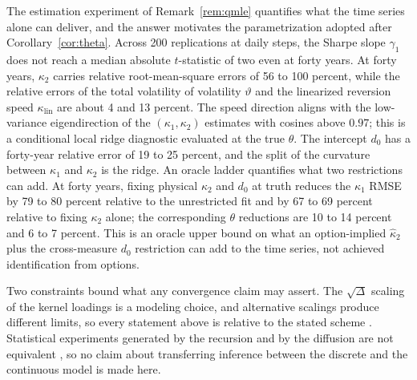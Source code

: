 \documentclass[11pt]{article}
\theoremstyle{remark}
\newcommand{\Dt}{\Delta}
\begin{document}
The estimation experiment of Remark~\ref{rem:qmle} quantifies what the
time series alone can deliver, and the answer motivates the
parametrization adopted after Corollary~\ref{cor:theta}.
Across 200 replications at daily steps, the Sharpe slope $\gamma_1$ does
not reach a median absolute $t$-statistic of two even at forty years.
At forty years, $\kappa_2$ carries relative root-mean-square errors of 56
to 100 percent, while the relative errors of the total volatility of
volatility $\vartheta$ and the linearized reversion speed
$\kappa_{\mathrm{lin}}$ are about 4 and 13 percent.
The speed direction aligns with the low-variance eigendirection of the
$(\kappa_1,\kappa_2)$ estimates with cosines above $0.97$; this is a
conditional local ridge diagnostic evaluated at the true $\theta$.
The intercept $d_0$ has a forty-year relative error of 19 to 25 percent,
and the split of the curvature between $\kappa_1$ and $\kappa_2$ is the
ridge.
An oracle ladder quantifies what two restrictions can add.
At forty years, fixing physical $\kappa_2$ and $d_0$ at truth reduces the
$\kappa_1$ RMSE by 79 to 80 percent relative to the unrestricted fit and
by 67 to 69 percent relative to fixing $\kappa_2$ alone; the corresponding
$\theta$ reductions are 10 to 14 percent and 6 to 7 percent.
This is an oracle upper bound on what an option-implied
$\hat\kappa_2$ plus the cross-measure $d_0$ restriction can add to the time
series, not achieved identification from options.

Two constraints bound what any convergence claim may assert.
The $\sqrt{\Dt}$ scaling of the kernel loadings is a modeling choice, and
alternative scalings produce different limits, so every statement above is
relative to the stated scheme \cite{Corradi2000}.
Statistical experiments generated by the recursion and by the diffusion are
not equivalent \cite{Wang2002}, so no claim about transferring inference
between the discrete and the continuous model is made here.
\end{document}
